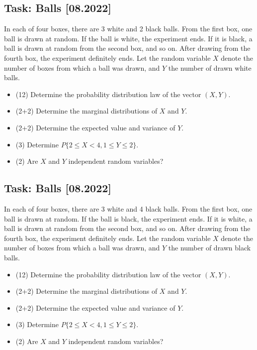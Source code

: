 \documentclass[a4paper, 12pt]{article}
\begin{document}
\subsection*{Task: Balls [08.2022]}

In each of four boxes, there are 3 white and 2 black balls. From the first box, one ball is drawn at random. If the ball is white, the experiment ends. If it is black, a ball is drawn at random from the second box, and so on. After drawing from the fourth box, the experiment definitely ends. Let the random variable $X$ denote the number of boxes from which a ball was drawn, and $Y$ the number of drawn white balls.

\begin{itemize}
    \item [a)] (12) Determine the probability distribution law of the vector $(X, Y)$.
    \item [b)] (2+2) Determine the marginal distributions of $X$ and $Y$.
    \item [c)] (2+2) Determine the expected value and variance of $Y$.
    \item [d)] (3) Determine $P\{2 \leq X < 4, 1 \leq Y \leq 2 \}$.
    \item [e)] (2) Are $X$ and $Y$ independent random variables?

\end{itemize}



\subsection*{Task: Balls [08.2022]}

In each of four boxes, there are 3 white and 4 black balls. From the first box, one ball is drawn at random. If the ball is black, the experiment ends. If it is white, a ball is drawn at random from the second box, and so on. After drawing from the fourth box, the experiment definitely ends. Let the random variable $X$ denote the number of boxes from which a ball was drawn, and $Y$ the number of drawn black balls.

\begin{itemize}
    \item [a)] (12) Determine the probability distribution law of the vector $(X, Y)$.
    \item [b)] (2+2) Determine the marginal distributions of $X$ and $Y$.
    \item [c)] (2+2) Determine the expected value and variance of $Y$.
    \item [d)] (3) Determine $P\{2 \leq X < 4, 1 \leq Y \leq 2 \}$.
    \item [e)] (2) Are $X$ and $Y$ independent random variables?
\end{itemize}
\end{document}
